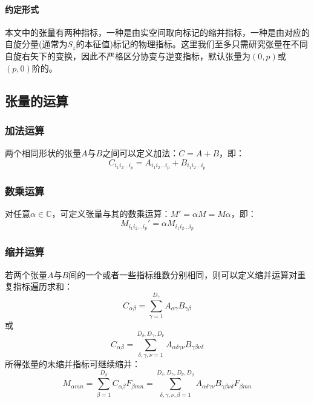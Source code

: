 \paragraph{约定形式}
本文中的张量有两种指标，一种是由实空间取向标记的缩并指标，一种是由对应的自旋分量(通常为$S_z$的本征值)标记的物理指标。这里我们至多只需研究张量在不同自旋右矢下的变换，因此不严格区分协变与逆变指标，默认张量为$(0,p)$或$(p,0)$阶的。

\subsection{张量的运算}

\subsubsection{加法运算}

两个相同形状的张量$A$与$B$之间可以定义加法：$C = A+B$，即：
\begin{equation}
C_{i_1 i_2 \dots i_p} = A_{i_1 i_2 \dots i_p} + B_{i_1 i_2 \dots i_p}
\end{equation}


\subsubsection{数乘运算}

对任意$\alpha \in \mathbb{C}$，可定义张量与其的数乘运算：$M' = \alpha M = M \alpha$，即：
\begin{equation}
M_{i_1 i_2 \dots i_p}' = \alpha M_{i_1 i_2 \dots i_p}
\end{equation}

\subsubsection{缩并运算}

若两个张量$A$与$B$间的一个或者一些指标维数分别相同，则可以定义缩并运算对重复指标遍历求和：
\begin{equation}
C_{\alpha\beta} = \sum_{\gamma=1}^{D_\gamma} A_{\alpha\gamma} B_{\gamma\beta}
\end{equation}
或
\begin{equation}
C_{\alpha\beta} = \sum_{\delta,\gamma,\nu=1}^{D_\delta,D_\gamma,D_\nu} A_{\alpha\delta\gamma\nu} B_{\gamma\beta\nu\delta}
\end{equation}
所得张量的未缩并指标可继续缩并：
\begin{equation}
\label{eq.1.5}
M_{\alpha m n} = \sum_{\beta=1}^{D_\beta} C_{\alpha\beta} F_{\beta m n}
	= \sum_{\delta,\gamma,\nu,\beta=1}^{D_\delta,D_\gamma,D_\nu,D_\beta} A_{\alpha\delta\gamma\nu} B_{\gamma\beta\nu\delta} F_{\beta m n}
\end{equation}


